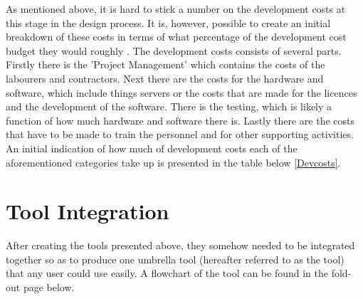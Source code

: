 As mentioned above, it is hard to stick a number on the development costs at this stage in the design process. It is, however, possible to create an initial breakdown of these costs in terms of what percentage of the development cost budget they would roughly . The development costs consists of several parts. Firstly there is the 'Project Management' which contains the costs of the labourers and contractors. Next there are the costs for the hardware and software, which include things servers or the costs that are made for the licences and the development of the software. There is the testing, which is likely a function of how much hardware and software there is. Lastly there are the costs that have to be made to train the personnel and for other supporting activities. An initial indication of how much of development costs each of the aforementioned categories take up is presented in the table below \ref{Devcosts}. 



{\small
\begin{table}[H]
\centering
\captionsetup{justification=centering}
\caption{Breakdown of development costs}
\label{Devcosts}
\end{table}
}






\section{Tool Integration} 
\label{sec:toolintegration}

After creating the tools presented above, they somehow needed to be integrated together so as to produce one umbrella tool (hereafter referred to as the tool) that any user could use easily. A flowchart of the tool can be found in the fold-out page below. 

